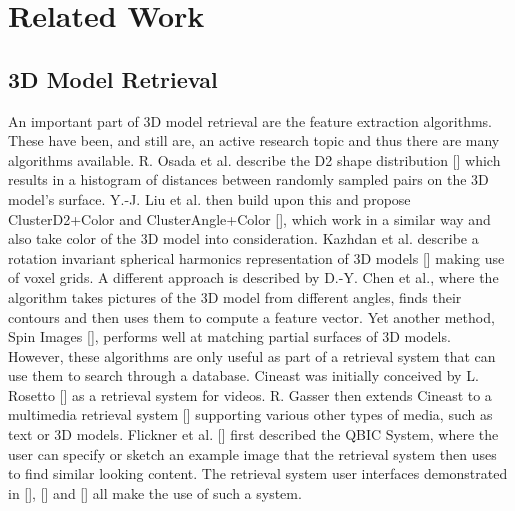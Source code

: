 \chapter{Related Work}

\section{3D Model Retrieval}

An important part of 3D model retrieval are the feature extraction algorithms. These have been, and still are, an active research topic and thus there are many algorithms available. R. Osada et al. describe the D2 shape distribution [] which results in a histogram of distances between randomly sampled pairs on the 3D model's surface. Y.-J. Liu et al. then build upon this and propose ClusterD2+Color and ClusterAngle+Color [], which work in a similar way and also take color of the 3D model into consideration. Kazhdan et al. describe a rotation invariant spherical harmonics representation of 3D models [] making use of voxel grids. A different approach is described by D.-Y. Chen et al., where the algorithm takes pictures of the 3D model from different angles, finds their contours and then uses them to compute a feature vector. Yet another method, Spin Images [], performs well at matching partial surfaces of 3D models.\\
However, these algorithms are only useful as part of a retrieval system that can use them to search through a database. Cineast was initially conceived by L. Rosetto [] as a retrieval system for videos. R. Gasser then extends Cineast to a multimedia retrieval system [] supporting various other types of media, such as text or 3D models. Flickner et al. [] first described the QBIC System, where the user can specify or sketch an example image that the retrieval system then uses to find similar looking content. The retrieval system user interfaces demonstrated in [], [] and [] all make the use of such a system.

